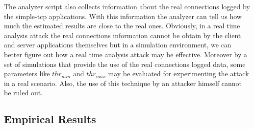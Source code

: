 The analyzer script also collects information about the
real connections logged by the simple-tcp applications. With this
information the analyzer can tell us how much the estimated results are
close to the real ones. Obviously, in a real time analysis attack the real connections
information cannot be obtain by the client and server applications themselves 
but in a simulation environment, we can better figure out how a real
time analysis attack may be effective. Moreover by a set of simulations
that provide the use of the real connections logged data, some
parameters like $thr_{min}$ and $thr_{max}$ may be evaluated for 
experimenting the attack in a real scenario. Also, the use of this technique
by an attacker himself cannot be ruled out. 
\subsection{Empirical Results}

